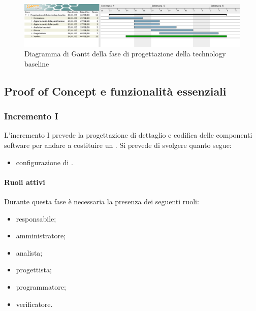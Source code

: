         \begin{landscape}

          \begin{figure}[H]
            \centering
            \includegraphics[width=\linewidth]{images/gantt/progettazioneTechnologyBaseline} %
            \caption{Diagramma di Gantt della fase di progettazione della technology baseline}
          \end{figure}

		\end{landscape}		


		
		\subsection{Proof of Concept e funzionalità essenziali}

		\subsubsection{Incremento I}
			
			L'incremento I prevede la progettazione di dettaglio e codifica delle componenti software per andare a costituire un . Si prevede di svolgere quanto segue:
			\begin{itemize}
				\item configurazione di .
			\end{itemize}
			
			\paragraph{Ruoli attivi}
			
				Durante questa fase è necessaria la presenza dei seguenti ruoli:
				\begin{itemize}
					\item responsabile;
					\item amministratore;
					\item analista;
					\item progettista;
					\item programmatore;
					\item verificatore.
				\end{itemize}
			
